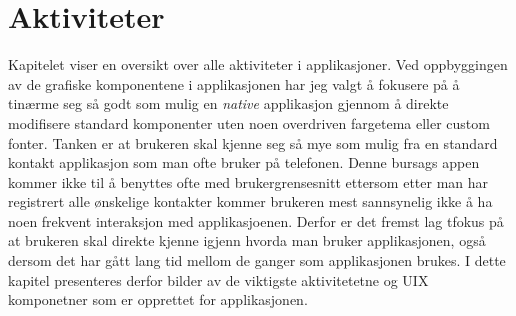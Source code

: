\chapter{Aktiviteter}
Kapitelet viser en oversikt over alle aktiviteter i applikasjoner. Ved oppbyggingen av de grafiske komponentene i applikasjonen har jeg valgt å fokusere på å tinærme seg så godt som mulig en \textit{native} applikasjon gjennom å direkte modifisere standard komponenter uten noen overdriven fargetema eller custom fonter. Tanken er at brukeren skal kjenne seg så mye som mulig fra en standard kontakt applikasjon som man ofte bruker på telefonen. Denne bursags appen kommer ikke til å benyttes ofte med brukergrensesnitt ettersom etter man har registrert alle ønskelige kontakter kommer brukeren mest sannsynelig ikke å ha noen frekvent interaksjon med applikasjoenen. Derfor er det fremst lag tfokus på at brukeren skal direkte kjenne igjenn hvorda man bruker applikasjonen, også dersom det har gått lang tid mellom de ganger som applikasjonen brukes. I dette kapitel presenteres derfor bilder av de viktigste aktivitetetne og UIX komponetner som er opprettet for applikasjonen. 

